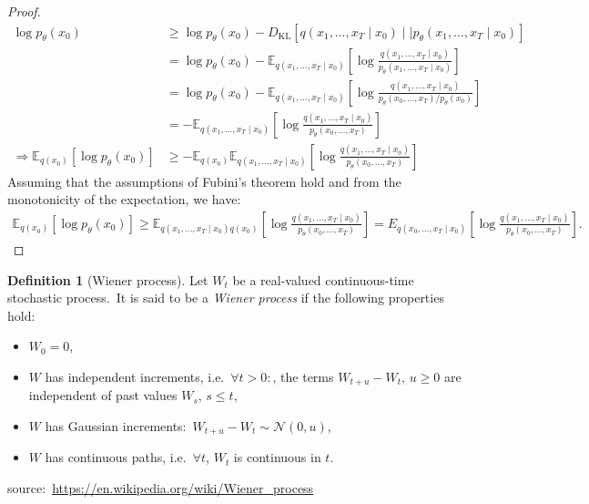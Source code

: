 \documentclass[12pt, a4paper]{article}
\numberwithin{equation}{section}
\theoremstyle{definition}
\theoremstyle{definition}
\newtheorem{defn}[thm]{Definition} %
\begin{document}
\begin{proof}
\cite{lilian_weng}
	\begin{align}
		\log p_{\theta}(x_{0}) &\geq \log p_{\theta}(x_{0}) - D_{\text{KL}}\left[ q(x_{1}, \dots, x_{T}\mid x_{0})\mid\mid p_{\theta}(x_{1}, \dots, x_{T}\mid x_{0}) \right]
		\\[4pt] &= \log p_{\theta}(x_{0}) - \mathbb E_{q(x_{1}, \dots, x_{T}\mid x_{0})}\left[\log\frac{q(x_{1}, \dots, x_{T}\mid x_{0})}{p_{\theta}(x_{1}, \dots, x_{T} \mid x_{0})}\right]
		\\[4pt] &= \log p_{\theta}(x_{0}) - \mathbb E_{q(x_{1}, \dots, x_{T}\mid x_{0})}\left[\log\frac{q(x_{1}, \dots, x_{T}\mid x_{0})}{p_{\theta}(x_{0}, \dots, x_{T})/ p_{\theta}(x_{0})}\right]
		\\[4pt] &= -\mathbb E_{q(x_{1}, \dots, x_{T}\mid x_{0})}\left[\log\frac{q(x_{1}, \dots, x_{T}\mid x_{0})}{p_{\theta}(x_{0}, \dots, x_{T})}\right]
		\\[4pt] \Rightarrow \mathbb E_{q(x_{0})}\left[\log p_{\theta}(x_{0})\right] &\geq -\mathbb E_{q(x_{0})}\mathbb E_{q(x_{1}, \dots, x_{T}\mid x_{0})}\left[\log\frac{q(x_{1}, \dots, x_{T}\mid x_{0})}{p_{\theta}(x_{0}, \dots, x_{T})}\right]
	\end{align}
	Assuming that the assumptions of Fubini's theorem hold and from the monotonicity of the expectation, we have: 
	\begin{align}\label{diff_elbo_to_be_proved}
		\mathbb E_{q(x_{0})}\left[ \log p_{\theta}(x_{0}) \right] \geq \mathbb E_{q(x_{1}, \dots,  x_{T} \mid x_{0})q(x_{0})}\left[\log \frac{q(x_{1}, \dots, x_{T} \mid x_{0})}{p_{\theta}(x_{0}, \dots, x_{T})}\right] = E_{q(x_{0}, \dots,  x_{T} \mid x_{0})}\left[\log \frac{q(x_{1}, \dots, x_{T} \mid x_{0})}{p_{\theta}(x_{0}, \dots, x_{T})}\right].
	\end{align}
\end{proof}

\begin{defn}[Wiener process]
	Let $W_{t}$ be a real-valued continuous-time stochastic process.\ It is said to be a \textit{Wiener process} if the following properties hold: 
	\begin{itemize}
		\item $W_{0} = 0$, 
		\item $W$ has independent increments, i.e.\ $\forall t > 0:$, the terms $W_{t+u} - W_{t}$, $u\geq 0$ are independent of past values $W_{s}$, $s\leq t$, 
		\item $W$ has Gaussian increments:\ $W_{t+u} - W_{t} \sim \mathcal N(0, u)$, 
		\item $W$ has continuous paths, i.e.\ $\forall t$, $W_{t}$ is continuous in $t$. 
	\end{itemize}
	source:\ \url{https://en.wikipedia.org/wiki/Wiener_process}
\end{defn}
\end{document}

